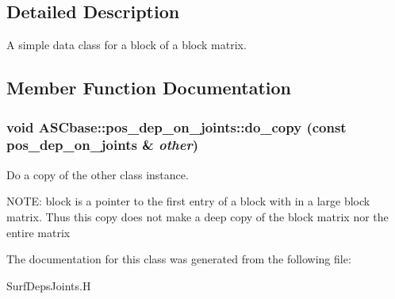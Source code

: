 \subsection{Detailed Description}
A simple data class for a block of a block matrix. 



\subsection{Member Function Documentation}
\subsubsection{\setlength{\rightskip}{0pt plus 5cm}void ASCbase::pos\_\-dep\_\-on\_\-joints::do\_\-copy (const \bf{pos\_\-dep\_\-on\_\-joints} \& {\em other})\hspace{0.3cm}{\tt  [inline, private]}}\label{classASCbase_1_1pos__dep__on__joints_ae39e679f64999ac2afd3896e7bcf2de}


Do a copy of the other class instance. 

NOTE: block is a pointer to the first entry of a block with in a large block matrix. Thus this copy does not make a deep copy of the block matrix nor the entire matrix 

The documentation for this class was generated from the following file:\begin{CompactItemize}
\item 
Surf\-Deps\-Joints.H\end{CompactItemize}
